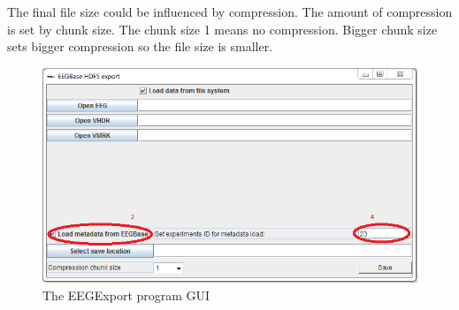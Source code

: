 \documentclass{diplomka}
\begin{document}
The final file size could be influenced by compression. The amount of compression is set by chunk size. The chunk size 1 means no compression. Bigger chunk size sets bigger compression so the file size is smaller.



\begin{figure}[h]
	\begin{center}		
		\includegraphics[scale=0.75]{obrazky/appendix/gui-meta.png}
		\caption{The EEGExport program GUI}
		\label{prg_meta}
	\end{center}
\end{figure}
\end{document}
